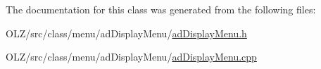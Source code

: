 The documentation for this class was generated from the following files\+:\begin{DoxyCompactItemize}
\item 
O\+L\+Z/src/class/menu/ad\+Display\+Menu/\hyperlink{ad_display_menu_8h}{ad\+Display\+Menu.\+h}\item 
O\+L\+Z/src/class/menu/ad\+Display\+Menu/\hyperlink{ad_display_menu_8cpp}{ad\+Display\+Menu.\+cpp}\end{DoxyCompactItemize}
